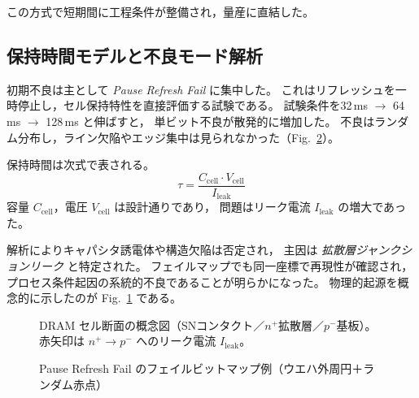 \documentclass[conference]{IEEEtran}
\begin{document}
この方式で短期間に工程条件が整備され，量産に直結した。

\subsection{保持時間モデルと不良モード解析}
初期不良は主として \emph{Pause Refresh Fail} に集中した。
これはリフレッシュを一時停止し，セル保持特性を直接評価する試験である。
試験条件を32\,ms $\rightarrow$ 64\,ms $\rightarrow$ 128\,ms と伸ばすと，
単ビット不良が散発的に増加した。
不良はランダム分布し，ライン欠陥やエッジ集中は見られなかった（Fig.~\ref{fig:failmap}）。

保持時間は次式で表される。
\begin{equation}
\tau = \frac{C_{\mathrm{cell}} \cdot V_{\mathrm{cell}}}{I_{\mathrm{leak}}}
\end{equation}
容量 $C_{\mathrm{cell}}$，電圧 $V_{\mathrm{cell}}$ は設計通りであり，
問題はリーク電流 $I_{\mathrm{leak}}$ の増大であった。

解析によりキャパシタ誘電体や構造欠陥は否定され，
主因は \emph{拡散層ジャンクションリーク} と特定された。
フェイルマップでも同一座標で再現性が確認され，
プロセス条件起因の系統的不良であることが明らかになった。
物理的起源を概念的に示したのが Fig.~\ref{fig:dram_cross_section} である。

\begin{figure}[t]
\centering
{}
\caption{DRAM セル断面の概念図（SNコンタクト／$n^+$拡散層／$p^-$基板）。赤矢印は $n^+ \rightarrow p^-$ へのリーク電流 $I_{\mathrm{leak}}$。}
\label{fig:dram_cross_section}
\end{figure}

\begin{figure}[t]
\centering
{}
\caption{Pause Refresh Fail のフェイルビットマップ例（ウエハ外周円＋ランダム赤点）}
\label{fig:failmap}
\end{figure}
\end{document}

